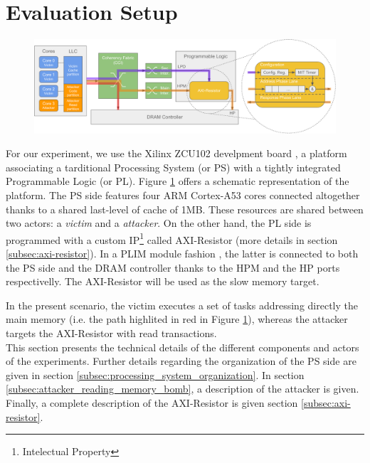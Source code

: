 \section{Evaluation Setup}
    \label{sec:evaluation_setup}
    \begin{figure}
        \centering
        \includegraphics[scale=0.56]{images/Evaluation_setup.pdf}
        \caption{}
        \label{fig:system_schematic}
    \end{figure}
    For our experiment, we use the Xilinx ZCU102 develpment board \cite{Xilinx-ULTRASCALE-TRM}, a platform associating a tarditional Processing System (or PS) with a tightly integrated Programmable Logic (or PL). Figure \ref{fig:system_schematic} offers a schematic representation of the platform.
    The PS side features four ARM Cortex-A53 cores \cite{ARM-cortex-A53} connected altogether thanks to a shared last-level of cache of 1MB. These resources are shared between two actors: a \emph{victim} and a \emph{attacker}. On the other hand, the PL side is programmed with a custom IP\footnote{Intelectual Property} called AXI-Resistor (more details in section \ref{subsec:axi-resistor}). In a PLIM module fashion \cite{PLIM20}, the latter is connected to both the PS side and the DRAM controller thanks to the HPM and the HP ports respectivelly. The AXI-Resistor will be used as the slow memory target.

    In the present scenario, the victim executes a set of tasks addressing directly the main memory (i.e. the path highlited in red in Figure \ref{fig:system_schematic}), whereas the attacker targets the AXI-Resistor with read transactions.\\

    This section presents the technical details of the different components and actors of the experiments. Further details regarding the organization of the PS side are given in section \ref{subsec:processing_system_organization}. In section \ref{subsec:attacker_reading_memory_bomb}, a description of the attacker is given. Finally, a complete description of the AXI-Resistor is given section \ref{subsec:axi-resistor}.

